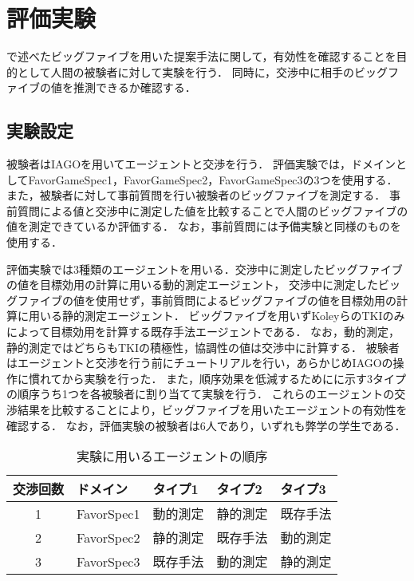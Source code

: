

\chapter{評価実験}
で述べたビッグファイブを用いた提案手法に関して，有効性を確認することを目的として人間の被験者に対して実験を行う．
同時に，交渉中に相手のビッグファイブの値を推測できるか確認する．

\section{実験設定}
被験者はIAGOを用いてエージェントと交渉を行う．
評価実験では，ドメインとしてFavorGameSpec1，FavorGameSpec2，FavorGameSpec3の3つを使用する．
また，被験者に対して事前質問を行い被験者のビッグファイブを測定する．
事前質問による値と交渉中に測定した値を比較することで人間のビッグファイブの値を測定できているか評価する．
なお，事前質問には予備実験と同様のものを使用する．

評価実験では3種類のエージェントを用いる．交渉中に測定したビッグファイブの値を目標効用の計算に用いる動的測定エージェント，
交渉中に測定したビッグファイブの値を使用せず，事前質問によるビッグファイブの値を目標効用の計算に用いる静的測定エージェント．
ビッグファイブを用いずKoleyらのTKIのみによって目標効用を計算する既存手法エージェントである．
なお，動的測定，静的測定ではどちらもTKIの積極性，協調性の値は交渉中に計算する．
被験者はエージェントと交渉を行う前にチュートリアルを行い，あらかじめIAGOの操作に慣れてから実験を行った．
また，順序効果を低減するためにに示す3タイプの順序うち1つを各被験者に割り当てて実験を行う．
これらのエージェントの交渉結果を比較することにより，ビッグファイブを用いたエージェントの有効性を確認する．
なお，評価実験の被験者は6人であり，いずれも弊学の学生である．

\begin{table}[tb]
    \centering
    \caption{実験に用いるエージェントの順序}
    \begin{tabular}{cllll} \toprule
        交渉回数 & ドメイン & タイプ1 & タイプ2 & タイプ3 \\ \midrule
        1 & FavorSpec1 & 動的測定 & 静的測定 & 既存手法 \\
        2 & FavorSpec2 & 静的測定 & 既存手法 & 動的測定 \\
        3 & FavorSpec3 & 既存手法 & 動的測定 & 静的測定 \\ \bottomrule
    \end{tabular}
    \label{tab:exp-order}
\end{table}

